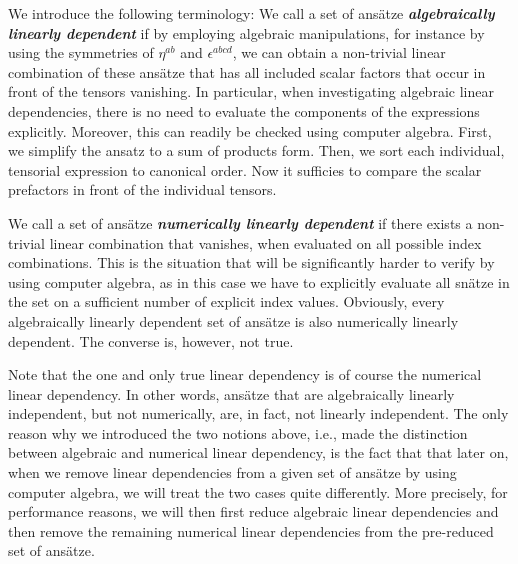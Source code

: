 We introduce the following terminology: We call a set of ansätze \textit{\textbf{algebraically linearly dependent}} if by employing algebraic manipulations, for instance by using the symmetries of $\eta^{ab}$ and $\epsilon^{abcd}$, we can obtain a non-trivial linear combination of these ansätze that has all included scalar factors that occur in front of the tensors vanishing. In particular, when investigating algebraic linear dependencies, there is no need to evaluate the components of the expressions explicitly. 
Moreover, this can readily be checked using computer algebra. First, we simplify the ansatz to a sum of products form. Then, we sort each individual, tensorial expression to canonical order. Now it sufficies to compare the scalar prefactors in front of the individual tensors.

We call a set of ansätze \textbf{\textit{numerically linearly dependent}} if there exists a non-trivial linear combination that vanishes, when evaluated on all possible index combinations.
This is the situation that will be significantly harder to verify by using computer algebra,
as in this case we have to explicitly evaluate all snätze in the set on a sufficient number of explicit index values.
Obviously, every algebraically linearly dependent set of ansätze is also numerically linearly dependent. The converse is, however, not true. 

\begin{remark}
Note that the one and only true linear dependency is of course the numerical linear dependency. In other words, ansätze that are algebraically linearly independent, but not numerically, are, in fact, not linearly independent. The only reason why we introduced the two notions above, i.e., made the distinction between algebraic and numerical linear dependency, is the fact that that later on, when we remove linear dependencies from a given set of ansätze by using computer algebra, we will treat the two cases quite differently. More precisely, for performance reasons, we will then first reduce algebraic linear dependencies and then remove the remaining numerical linear dependencies from the pre-reduced set of ansätze. 
\end{remark}

